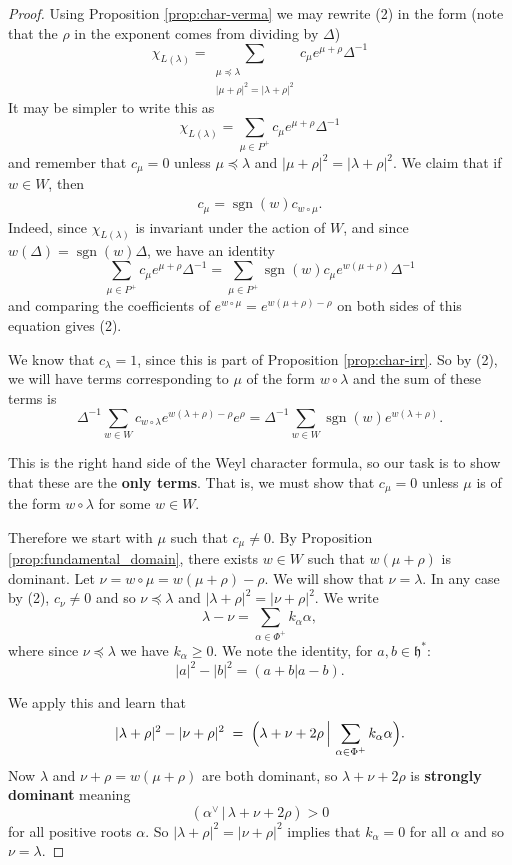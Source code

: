 \documentclass[12pt]{article}
\begin{document}
\begin{proof}
    Using Proposition \ref{prop:char-verma} we may rewrite (2) in the form (note that the $\rho$ in the exponent comes from dividing by $\Delta$)
    \[
        \chi_{L(\lambda)} = \sum_{\substack{\mu \preceq \lambda \\ |\mu+\rho|^2 = |\lambda+\rho|^2}} c_{\mu} e^{\mu+\rho} \Delta^{-1}
    \]
    It may be simpler to write this as
    \[
        \chi_{L(\lambda)} = \sum_{\mu \in P^+} c_{\mu} e^{\mu+\rho} \Delta^{-1}
    \]
    and remember that $c_{\mu} = 0$ unless $\mu \preceq \lambda$ and $|\mu + \rho|^2 = |\lambda + \rho|^2$. We claim that if $w \in W$, then
    \begin{align}
        c_{\mu} = \operatorname{sgn}(w) c_{w \circ \mu}.
    \end{align}
    Indeed, since $\chi_{L(\lambda)}$ is invariant under the action of $W$, and since $w(\Delta) = \operatorname{sgn}(w)\Delta$, we have an identity
    \[
        \sum_{\mu \in P^+} c_{\mu} e^{\mu+\rho} \Delta^{-1} = \sum_{\mu \in P^+} \operatorname{sgn}(w)c_{\mu} e^{w(\mu+\rho)} \Delta^{-1}
    \]
    and comparing the coefficients of $e^{w \circ \mu} = e^{w(\mu+\rho)-\rho}$ on both sides of this equation gives (2).

    We know that $c_{\lambda} = 1$, since this is part of Proposition \ref{prop:char-irr}. So by (2), we will have terms corresponding to $\mu$ of the form $w \circ \lambda$ and the sum of these terms is
    \[
        \Delta^{-1} \sum_{w \in W} c_{w \circ \lambda} e^{w(\lambda+\rho)-\rho} e^{\rho} = \Delta^{-1} \sum_{w \in W} \operatorname{sgn}(w) e^{w(\lambda+\rho)}.
    \]

    This is the right hand side of the Weyl character formula, so our task is to show that these are the \textbf{only terms}. That is, we must show that $c_\mu = 0$ unless $\mu$ is of the form $w \circ \lambda$ for some $w \in W$.

    Therefore we start with $\mu$ such that $c_\mu \neq 0$. By Proposition \ref{prop:fundamental_domain}, there exists $w \in W$ such that $w(\mu + \rho)$ is dominant. Let $\nu = w \circ \mu = w(\mu + \rho) - \rho$. We will show that $\nu = \lambda$. In any case by (2), $c_\nu \neq 0$ and so $\nu \preccurlyeq \lambda$ and $|\lambda + \rho|^2 = |\nu + \rho|^2$. We write
    \[
        \lambda - \nu = \sum_{\alpha \in \Phi^+} k_\alpha \alpha,
    \]
    where since $\nu \preccurlyeq \lambda$ we have $k_\alpha \geq 0$. We note the identity, for $a, b \in \mathfrak{h}^*$:
    \[
        |a|^2 - |b|^2 = (a+b|a-b).
    \]

    We apply this and learn that
    \[
        |\lambda + \rho|^2 - |\nu + \rho|^2 \;=\;
        \Bigl( \lambda + \nu + 2\rho \,\Big|\, \sum_{\alpha \in \Phi^+} k_\alpha \alpha \Bigr).
    \] Now $\lambda$ and $\nu + \rho = w(\mu + \rho)$ are both dominant, so $\lambda + \nu + 2\rho$ is \textbf{strongly dominant} meaning
    \[
        (\alpha^\vee \,|\, \lambda + \nu + 2\rho) > 0
    \]
    for all positive roots $\alpha$. So $|\lambda + \rho|^2 = |\nu + \rho|^2$ implies that $k_\alpha = 0$ for all $\alpha$ and so $\nu = \lambda$.
\end{proof}
\end{document}
